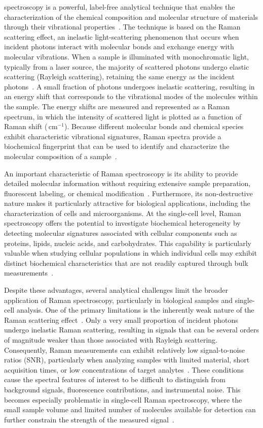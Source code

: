 \documentclass[journal,onecolumn]{IEEEtran}
\newcommand{\wn}{\,cm$^{-1}$}              %
\begin{document}
 spectroscopy is a powerful, label-free analytical
technique that enables the characterization of the chemical composition and
molecular structure of materials through their vibrational
properties~\cite{smith2013modern}. The technique is based on the Raman
scattering effect, an inelastic light-scattering phenomenon that occurs when
incident photons interact with molecular bonds and exchange energy with
molecular vibrations. When a sample is illuminated with monochromatic light,
typically from a laser source, the majority of scattered photons undergo
elastic scattering (Rayleigh scattering), retaining the same energy as the
incident photons~\cite{rostron2016raman}. A small fraction of photons
undergoes inelastic scattering, resulting in an energy shift that corresponds
to the vibrational modes of the molecules within the sample. The energy shifts
are measured and represented as a Raman spectrum, in which the intensity of
scattered light is plotted as a function of Raman shift (\wn). Because
different molecular bonds and chemical species exhibit characteristic
vibrational signatures, Raman spectra provide a biochemical fingerprint that
can be used to identify and characterize the molecular composition of a
sample~\cite{smith2013modern}.

An important characteristic of Raman spectroscopy is its ability to provide
detailed molecular information without requiring extensive sample
preparation, fluorescent labeling, or chemical
modification~\cite{yi2025surface}. Furthermore, its non-destructive nature
makes it particularly attractive for biological applications, including the
characterization of cells and microorganisms. At the single-cell level, Raman
spectroscopy offers the potential to investigate biochemical heterogeneity by
detecting molecular signatures associated with cellular components such as
proteins, lipids, nucleic acids, and carbohydrates. This capability is
particularly valuable when studying cellular populations in which individual
cells may exhibit distinct biochemical characteristics that are not readily
captured through bulk measurements~\cite{smith2013modern}.

Despite these advantages, several analytical challenges limit the broader
application of Raman spectroscopy, particularly in biological samples and
single-cell analysis. One of the primary limitations is the inherently weak
nature of the Raman scattering effect~\cite{yi2025surface}. Only a very small
proportion of incident photons undergo inelastic Raman scattering, resulting
in signals that can be several orders of magnitude weaker than those associated
with Rayleigh scattering. Consequently, Raman measurements can exhibit
relatively low signal-to-noise ratios (SNR), particularly when analyzing
samples with limited material, short acquisition times, or low concentrations
of target analytes~\cite{yi2025surface}. These conditions cause the spectral
features of interest to be difficult to distinguish from background signals,
fluorescence contributions, and instrumental noise. This becomes especially
problematic in single-cell Raman spectroscopy, where the small sample volume
and limited number of molecules available for detection can further constrain
the strength of the measured signal~\cite{smith2013modern}.
\end{document}
